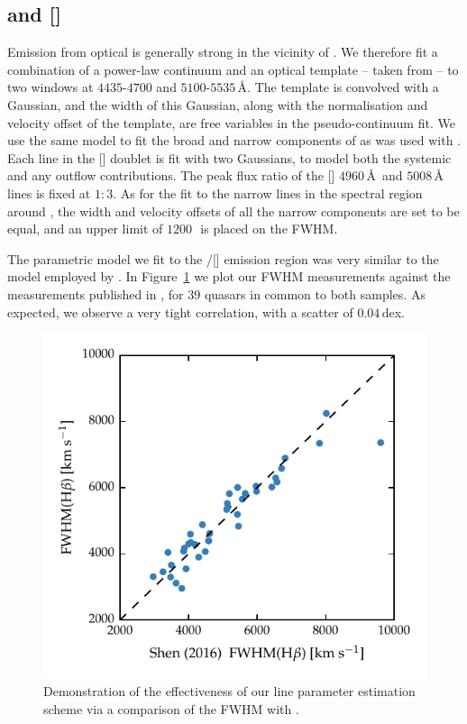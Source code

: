 \subsection{\hb and []}
\label{sec:hb}

Emission from optical  is generally strong in the vicinity of \hbns.
We therefore fit a combination of a power-law continuum and an optical  template -- taken from \citet{boroson92} -- to two windows at $4435$-$4700$ and $5100$-$5535$\,\AA. 
The  template is convolved with a Gaussian, and the width of this Gaussian, along with the normalisation and velocity offset of the  template, are free variables in the pseudo-continuum fit.
We use the same model to fit the broad and narrow components of \hb as was used with \hans. 
Each line in the [] doublet is fit with two Gaussians, to model both the systemic and any outflow contributions. 
The peak flux ratio of the [] $4960$\,\AA\, and $5008$\,\AA\, lines is fixed at $1:3$. 
As for the fit to the narrow lines in the spectral region around \hans, the width and velocity offsets of all the narrow components are set to be equal, and an upper limit of $1200$\,\kms\, is placed on the FWHM. 

The parametric model we fit to the \hbns/[] emission region was very similar to the model employed by \citet{shen16a}. 
In Figure~\ref{fig:shen_comparison_hb} we plot our \hb FWHM measurements against the measurements published in \citet{shen16a}, for $39$ quasars in common to both samples. 
As expected, we observe a very tight correlation, with a scatter of $0.04$\,dex. 

\begin{figure}
    \centering 
    \includegraphics[width=0.8\linewidth]{figures/chapter03/shen_comparison_hb.pdf} 
    \caption{Demonstration of the effectiveness of our line parameter estimation scheme via a comparison of the \hb FWHM with \citet{shen16a}.} 
    \label{fig:shen_comparison_hb}
\end{figure}

